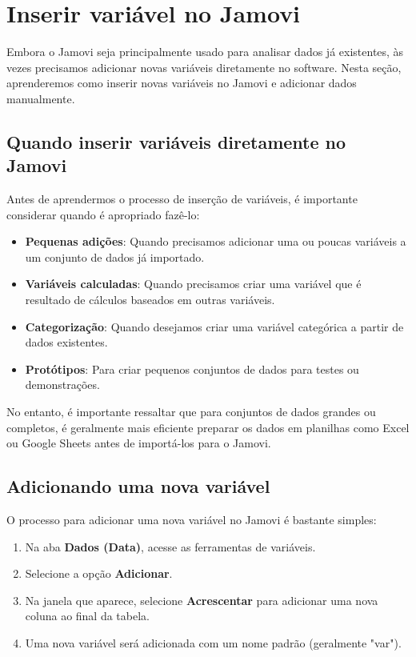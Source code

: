\section{Inserir variável no Jamovi}

Embora o Jamovi seja principalmente usado para analisar dados já existentes, às vezes precisamos adicionar novas variáveis diretamente no software. Nesta seção, aprenderemos como inserir novas variáveis no Jamovi e adicionar dados manualmente.

\subsection{Quando inserir variáveis diretamente no Jamovi}

Antes de aprendermos o processo de inserção de variáveis, é importante considerar quando é apropriado fazê-lo:

\begin{itemize}
    \item \textbf{Pequenas adições}: Quando precisamos adicionar uma ou poucas variáveis a um conjunto de dados já importado.
    \item \textbf{Variáveis calculadas}: Quando precisamos criar uma variável que é resultado de cálculos baseados em outras variáveis.
    \item \textbf{Categorização}: Quando desejamos criar uma variável categórica a partir de dados existentes.
    \item \textbf{Protótipos}: Para criar pequenos conjuntos de dados para testes ou demonstrações.
\end{itemize}

No entanto, é importante ressaltar que para conjuntos de dados grandes ou completos, é geralmente mais eficiente preparar os dados em planilhas como Excel ou Google Sheets antes de importá-los para o Jamovi.

\subsection{Adicionando uma nova variável}

O processo para adicionar uma nova variável no Jamovi é bastante simples:

\begin{enumerate}
    \item Na aba \textbf{Dados (Data)}, acesse as ferramentas de variáveis.
    \item Selecione a opção \textbf{Adicionar}.
    \item Na janela que aparece, selecione \textbf{Acrescentar} para adicionar uma nova coluna ao final da tabela.
    \item Uma nova variável será adicionada com um nome padrão (geralmente "var").
\end{enumerate}

